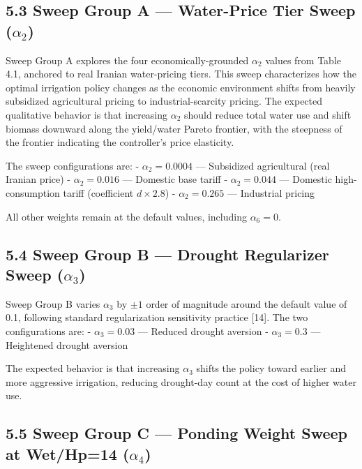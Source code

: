\subsection{\texorpdfstring{5.3 Sweep Group A --- Water-Price Tier Sweep
(\(\alpha_2\))}{5.3 Sweep Group A --- Water-Price Tier Sweep (\textbackslash alpha\_2)}}\label{sweep-group-a-water-price-tier-sweep-alpha_2}

Sweep Group A explores the four economically-grounded \(\alpha_2\)
values from Table 4.1, anchored to real Iranian water-pricing tiers.
This sweep characterizes how the optimal irrigation policy changes as
the economic environment shifts from heavily subsidized agricultural
pricing to industrial-scarcity pricing. The expected qualitative
behavior is that increasing \(\alpha_2\) should reduce total water use
and shift biomass downward along the yield/water Pareto frontier, with
the steepness of the frontier indicating the controller's price
elasticity.

The sweep configurations are: - \(\alpha_2 = 0.0004\) --- Subsidized
agricultural (real Iranian price) - \(\alpha_2 = 0.016\) --- Domestic
base tariff - \(\alpha_2 = 0.044\) --- Domestic high-consumption tariff
(coefficient \(d \times 2.8\)) - \(\alpha_2 = 0.265\) --- Industrial
pricing

All other weights remain at the default values, including
\(\alpha_6 = 0\).

\subsection{\texorpdfstring{5.4 Sweep Group B --- Drought Regularizer
Sweep
(\(\alpha_3\))}{5.4 Sweep Group B --- Drought Regularizer Sweep (\textbackslash alpha\_3)}}\label{sweep-group-b-drought-regularizer-sweep-alpha_3}

Sweep Group B varies \(\alpha_3\) by \(\pm 1\) order of magnitude around
the default value of 0.1, following standard regularization sensitivity
practice {[}14{]}. The two configurations are: - \(\alpha_3 = 0.03\) ---
Reduced drought aversion - \(\alpha_3 = 0.3\) --- Heightened drought
aversion

The expected behavior is that increasing \(\alpha_3\) shifts the policy
toward earlier and more aggressive irrigation, reducing drought-day
count at the cost of higher water use.

\subsection{\texorpdfstring{5.5 Sweep Group C --- Ponding Weight Sweep
at Wet/Hp=14
(\(\alpha_4\))}{5.5 Sweep Group C --- Ponding Weight Sweep at Wet/Hp=14 (\textbackslash alpha\_4)}}\label{sweep-group-c-ponding-weight-sweep-at-wethp14-alpha_4}

